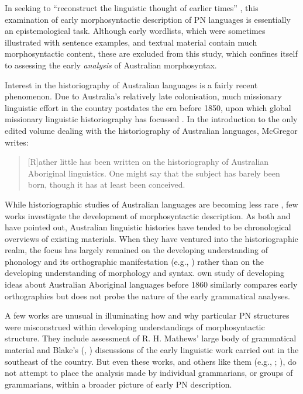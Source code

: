 In seeking to “reconstruct the linguistic thought of earlier times” \citep[1]{mcgregor_introduction_2008}, this examination of early morphosyntactic description of PN languages is essentially an epistemological task. Although early wordlists, which were sometimes illustrated with sentence examples, and textual material contain much morphosyntactic content, these are excluded from this study, which confines itself to assessing the early \textit{analysis} of Australian morphosyntax.

Interest in the historiography of Australian languages is a fairly recent phenomenon. Due to Australia’s relatively late colonisation, much missionary linguistic effort in the country postdates the era before 1850, upon which global missionary linguistic historiography has focussed \citep[vii]{zwartjes_forward_2014}. In the introduction to the only edited volume dealing with the historiography of Australian languages, McGregor writes: 

\begin{quote}
[R]ather little has been written on the historiography of Australian Aboriginal linguistics. One might say that the subject has barely been born, though it has at least been conceived. \citep[2]{mcgregor_introduction_2008}
\end{quote}

While historiographic studies of Australian languages are becoming less rare \citep[122--123]{mcgregor_missionary_2008}, few works investigate the development of morpho\-syntactic description. As both \citet{newton_more_1987} and \citet[13]{mcgregor_encountering_2008} have pointed out, Australian linguistic histories have tended to be chronological over\-views of existing materials. When they have ventured into the historiographic realm, the focus has largely remained on the developing understanding of phonology and its orthographic manifestation (e.g., \citealt{austin_gamilaraay_2008}) rather than on the developing understanding of morphology and syntax.  own study of developing ideas about Australian Aboriginal languages before 1860 similarly compares early orthographies but does not probe the nature of the early grammatical analyses.

 A few works are unusual in illuminating how and why particular PN structures were misconstrued within developing understandings of morphosyntactic structure. They include  assessment of R. H. Mathews’ large body of grammatical material and Blake's (\citeyear{blake_nineteenth-century_2015}, \citeyear{blake_nineteenth-century_2016}) discussions of the early linguistic work carried out in the southeast of the country. But even these works, and others like them (e.g., \citealt{simpson_i_2008}; \citealt{wafer_waiting_2011}), do not attempt to place the analysis made by individual grammarians, or groups of grammarians, within a broader picture of early PN description.
 
